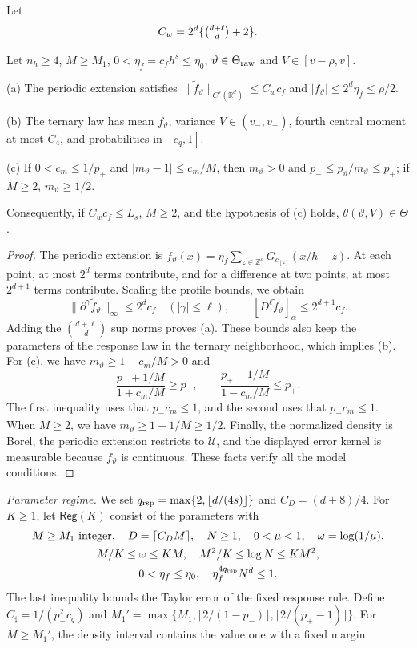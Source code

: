 Let
\begin{equation}\label{eq:LB-Cw}
 C_w=2^d\{\tbinom{d+\ell}{d}+2\}.
\end{equation}
\begin{lemma}\label{lem:legality}
Let $n_h\ge4$, $M\ge M_1$, $0<\eta_f=c_fh^s\le\eta_0$,
$\vartheta\in\Theta_{\rm raw}$ and $V\in[v-\rho,v]$.

\textup{(a)} The periodic extension satisfies
$\|\tilde f_\vartheta\|_{C^s(\mathbb R^d)}\le C_wc_f$ and
$|f_\vartheta|\le2^d\eta_f\le\rho/2$.

\textup{(b)} The ternary law has mean $f_\vartheta$, variance
$V\in(v_-,v_+)$, fourth central moment at most $C_4$, and probabilities
in $[c_q,1]$.

\textup{(c)} If $0<c_m\le1/p_+$ and $|m_\vartheta-1|\le c_m/M$,
then $m_\vartheta>0$ and $p_-\le p_\vartheta/m_\vartheta\le p_+$; if $M\ge2$,
$m_\vartheta\ge1/2$.

Consequently, if $C_wc_f\le L_s$, $M\ge2$, and the hypothesis
of \textup{(c)} holds,
$\theta(\vartheta,V)\in\Theta$.
\end{lemma}
\begin{proof}
The periodic extension is
$\tilde f_\vartheta(x)=\eta_f\sum_{z\in\mathbb Z^d}G_{c_{[z]}}(x/h-z)$.
At each point, at most $2^d$ terms contribute, and for a difference at
two points, at most $2^{d+1}$ terms contribute. Scaling the profile
bounds, we obtain
\[
 \|\partial^\gamma\tilde f_\vartheta\|_\infty\le2^dc_f
 \quad(|\gamma|\le\ell),\qquad
 [D^\ell\tilde f_\vartheta]_\alpha\le2^{d+1}c_f.
\]
Adding the $\binom{d+\ell}d$ sup norms proves (a). These bounds also keep the
parameters of the response law in the ternary neighborhood, which implies (b).
For (c), we have $m_\vartheta\ge1-c_m/M>0$ and
\[
 \frac{p_-+1/M}{1+c_m/M}\ge p_-,
 \qquad
 \frac{p_+-1/M}{1-c_m/M}\le p_+.
\]
The first inequality uses that $p_-c_m\le1$, and the second uses
that $p_+c_m\le1$. When $M\ge2$, we have $m_\vartheta\ge1-1/M\ge1/2$.
Finally, the normalized density is Borel, the periodic extension
restricts to $\mathcal U$, and the displayed error kernel is measurable
because $f_\vartheta$ is continuous. These facts verify all the model
conditions.
\end{proof}

\medskip\noindent\emph{Parameter regime.}
We set $q_{\rm rsp}=\max\{2,\lfloor d/(4s)\rfloor\}$ and
$C_D=(d+8)/4$. For $K\ge1$, let $\mathsf{Reg}(K)$ consist of the
parameters with
\begin{equation}\label{eq:LB-regime}
 \begin{gathered}
 M\ge M_1\ \text{integer},\quad D=\lceil C_DM\rceil,\quad
 N\ge1,\quad 0<\mu<1,\quad \omega=\log(1/\mu),\\
 M/K\le\omega\le KM,\quad M^2/K\le\log N\le KM^2,\\
 0<\eta_f\le\eta_0,\quad \eta_f^{4q_{\rm rsp}}N^d\le1.
 \end{gathered}
\end{equation}
The last inequality bounds the Taylor error of the fixed response
rule. Define $C_\sharp=1/(p_-^2c_q)$ and
$M_1'=\max\{M_1,\lceil2/(1-p_-)\rceil,\lceil2/(p_+-1)\rceil\}$.
For $M\ge M_1'$, the density interval contains the value one with a
fixed margin.

